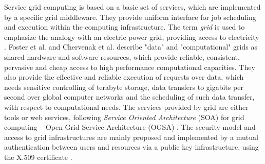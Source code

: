 Service grid computing is based on a basic set of services, which are implemented by a specific grid middleware. They provide uniform interface for job scheduling and execution within the computing infrastructure. The term \emph{grid} is used to emphasize the analogy with an electric power grid, providing access to electricity \cite{foster2004}. Foster et al.\cite{foster2001,foster2004} and Chervenak et al. \cite{Chervenak2000} describe "data" and "computational" grids as shared hardware and software resources, which provide reliable, consistent, pervasive and cheap access to high performance computational capacities. They also provide the effective and reliable execution of requests over data, which needs sensitive controlling of terabyte storage, data transfers to gigabits per second over global computer networks and the scheduling of such data transfer, with respect to computational needs. The services provided by grid are either tools or web services, following  \emph{Service Oriented Architecture} (SOA) for grid computing -- Open Grid Service Architecture (OGSA) \cite{Foster2003}. The security model and access to grid infrastructures are mainly proposed and implemented by a mutual authentication between users and resources via a public key infrastructure, using the X.509 certificate \cite{Foster1998}.
